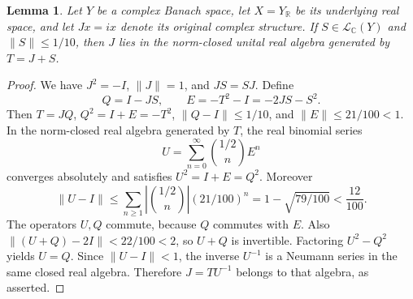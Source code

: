 \documentclass[11pt,a4paper]{article}
\newtheorem{lemma}[theorem]{Lemma}
\theoremstyle{remark}
\begin{document}
\begin{lemma}\label{lem:920-recovery}
Let $Y$ be a complex Banach space, let $X=Y_{\mathbb R}$ be its
underlying real space, and let $Jx=ix$ denote its original complex
structure.  If $S\in\mathcal L_{\mathbb C}(Y)$ and $\|S\|\leq1/10$,
then $J$ lies in the norm-closed unital real algebra generated by
$T=J+S$.
\end{lemma}
\begin{proof}
We have $J^2=-I$, $\|J\|=1$, and $JS=SJ$.  Define
\[
 Q=I-JS,\qquad E=-T^2-I=-2JS-S^2.
\]
Then $T=JQ$, $Q^2=I+E=-T^2$, $\|Q-I\|\leq1/10$, and
$\|E\|\leq21/100<1$.  In the norm-closed real algebra generated by
$T$, the real binomial series
\[
 U=\sum_{n=0}^{\infty}\binom{1/2}{n}E^n
\]
converges absolutely and satisfies $U^2=I+E=Q^2$.  Moreover
\[
 \|U-I\|\leq
 \sum_{n\geq1}\left|\binom{1/2}{n}\right|(21/100)^n
 =1-\sqrt{79/100}<\frac{12}{100}.
\]
The operators $U,Q$ commute, because $Q$ commutes with $E$.  Also
$\|(U+Q)-2I\|<22/100<2$, so $U+Q$ is invertible.  Factoring
$U^2-Q^2$ yields $U=Q$.  Since $\|U-I\|<1$, the inverse $U^{-1}$
is a Neumann series in the same closed real algebra.  Therefore
$J=TU^{-1}$ belongs to that algebra, as asserted.
\end{proof}
\end{document}
